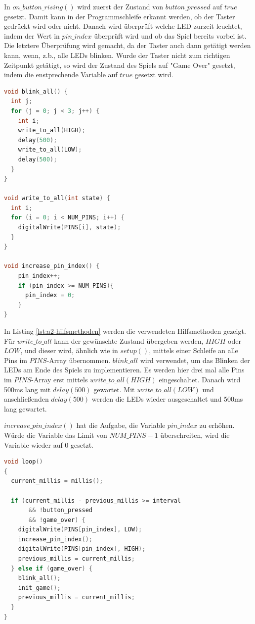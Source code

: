 In $on\_button\_rising()$ wird zuerst der Zustand von $button\_pressed$ auf $true$ gesetzt.
Damit kann in der Programmschleife erkannt werden, ob der Taster gedrückt wird oder nicht.
Danach wird überprüft welche LED zurzeit leuchtet, indem der Wert in $pin\_index$ überprüft wird und ob das Spiel bereits vorbei ist.
Die letztere Überprüfung wird gemacht, da der Taster auch dann getätigt werden kann, wenn, z.b., alle LEDs blinken.
Wurde der Taster nicht zum richtigen Zeitpunkt getätigt, so wird der Zustand des Spiels auf "Game Over" gesetzt, indem die enstprechende Variable auf $true$ gesetzt wird.

\begin{lstlisting}[language=C,label={lst:a2-hilfsmethoden}, caption={Hilfsmethoden}]
void blink_all() {
  int j;
  for (j = 0; j < 3; j++) {
    int i;
    write_to_all(HIGH);
    delay(500);
    write_to_all(LOW);
    delay(500);
  }
}

void write_to_all(int state) {
  int i;
  for (i = 0; i < NUM_PINS; i++) {
    digitalWrite(PINS[i], state);
  }
}

void increase_pin_index() {
    pin_index++;
    if (pin_index >= NUM_PINS){
      pin_index = 0;
    }
}
\end{lstlisting}

In Listing \ref{lst:a2-hilfsmethoden} werden die verwendeten Hilfsmethoden gezeigt.
Für $write\_to\_all$ kann der gewünschte Zustand übergeben werden, $HIGH$ oder $LOW$, und dieser wird, ähnlich wie in $setup()$, mittels einer Schleife an alle Pins im $PINS$-Array übernommen.
$blink\_all$ wird verwendet, um das Blinken der LEDs am Ende des Spiels zu implementieren.
Es werden hier drei mal alle Pins im $PINS$-Array erst mittels $write\_to\_all(HIGH)$ eingeschaltet.
Danach wird 500ms lang mit $delay(500)$ gewartet.
Mit $write\_to\_all(LOW)$ und anschließenden $delay(500)$ werden die LEDs wieder ausgeschaltet und 500ms lang gewartet.

$increase\_pin\_index()$ hat die Aufgabe, die Variable $pin\_index$ zu erhöhen.
Würde die Variable das Limit von $NUM\_PINS-1$ überschreiten, wird die Variable wieder auf 0 gesetzt.

\begin{lstlisting}[language=C,label={lst:a2-loop}, caption={Programmschleife}]
void loop()
{
  current_millis = millis();

  if (current_millis - previous_millis >= interval
       && !button_pressed
       && !game_over) {
    digitalWrite(PINS[pin_index], LOW);
    increase_pin_index();
    digitalWrite(PINS[pin_index], HIGH);
	previous_millis = current_millis;
  } else if (game_over) {
    blink_all();
    init_game();
    previous_millis = current_millis;
  }
}
\end{lstlisting}

